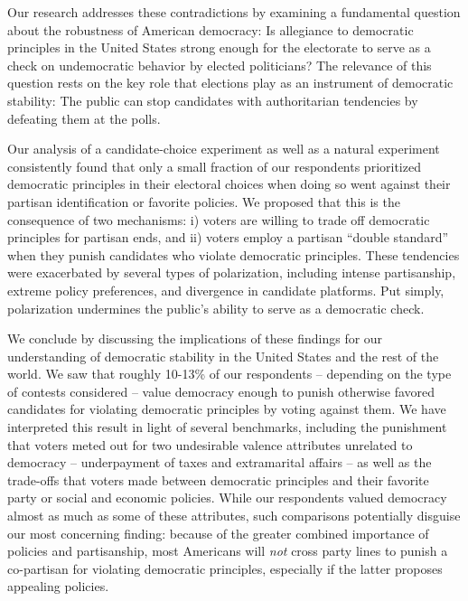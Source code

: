 \documentclass[letterpaper, 12pt]{article}
\begin{document}
\begin{raggedright}
Our research addresses these contradictions by examining a fundamental question about the robustness of American democracy: Is allegiance to democratic principles in the United States strong enough for the electorate to serve as a check on undemocratic behavior by elected politicians? The relevance of this question rests on the key role that elections play as an instrument of democratic stability: The public can stop candidates with authoritarian tendencies by defeating them at the polls.


Our analysis of a candidate-choice experiment as well as a natural experiment consistently found that only a small fraction of our respondents prioritized democratic principles in their electoral choices when doing so went against their partisan identification or favorite policies. We proposed that this is the consequence of two mechanisms: i) voters are willing to trade off democratic principles for partisan ends, and ii) voters employ a partisan ``double standard'' when they punish candidates who violate democratic principles. These tendencies were exacerbated by several types of polarization, including intense partisanship, extreme policy preferences, and divergence in candidate platforms. Put simply, polarization undermines the public's ability to serve as a democratic check.


We conclude by discussing the implications of these findings for our understanding of democratic stability in the United States and the rest of the world. We saw that roughly 10-13\% of our respondents -- depending on the type of contests considered -- value democracy enough to punish otherwise favored candidates for violating democratic principles by voting against them. We have interpreted this result in light of several benchmarks, including the punishment that voters meted out for two undesirable valence attributes unrelated to democracy -- underpayment of taxes and extramarital affairs -- as well as the trade-offs that voters made between democratic principles and their favorite party or social and economic policies. While our respondents valued democracy almost as much as some of these attributes, such comparisons potentially disguise our most concerning finding: because of the greater combined importance of policies and partisanship, most Americans will \emph{not} cross party lines to punish a co-partisan for violating democratic principles, especially if the latter proposes appealing policies.


\end{raggedright}
\end{document}
